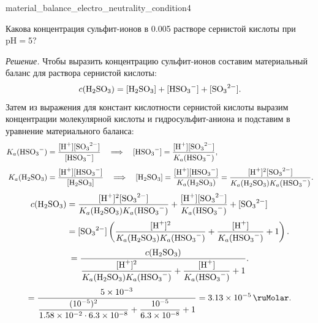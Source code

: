 \begin{example}{}{material_balance_electro_neutrality_condition4}
    \begin{condition}
        Какова концентрация сульфит-ионов в \qty{0,005}{\ruMolar} растворе сернистой кислоты при $\text{pH} = 5$?
    \end{condition}

    \medskip

    \textit{Решение.} Чтобы выразить концентрацию сульфит-ионов составим материальный баланс для раствора сернистой кислоты:
    \begin{equation*}
        c(\ce{H2SO3}) = [\ce{H2SO3}] + [\ce{HSO3^-}] + [\ce{SO3^{2-}}].
    \end{equation*}
    Затем из выражения для констант кислотности сернистой кислоты выразим концентрации молекулярной кислоты и гидросульфит-аниона и подставим в уравнение материального баланса:
    \begin{align*}
        K_a(\ce{HSO3^-}) &= \frac{[\ce{H^+}][\ce{SO3^{2-}}]}{[\ce{HSO3^-}]}
        \quad\Longrightarrow\quad
        [\ce{HSO3^-}] = \frac{[\ce{H^+}][\ce{SO3^{2-}}]}{K_a(\ce{HSO3^-})}, \\[0.8ex]
        K_a(\ce{H2SO3}) &= \frac{[\ce{H^+}][\ce{HSO3^-}]}{[\ce{H2SO3}]}
        \quad\Longrightarrow\quad
        [\ce{H2SO3}] = \frac{[\ce{H^+}][\ce{HSO3^-}]}{K_a(\ce{H2SO3})}
        = \frac{[\ce{H^+}]^2[\ce{SO3^{2-}}]}{K_a(\ce{H2SO3})K_a(\ce{HSO3^-})}.
    \end{align*}
    \begin{align*}
        c(\ce{H2SO3}) &= \frac{[\ce{H^+}]^2[\ce{SO3^{2-}}]}{K_a(\ce{H2SO3})K_a(\ce{HSO3^-})}
        + \frac{[\ce{H^+}][\ce{SO3^{2-}}]}{K_a(\ce{HSO3^-})}
        + [\ce{SO3^{2-}}] \\[0.5ex]
        &= [\ce{SO3^{2-}}]\left(
            \frac{[\ce{H^+}]^2}{K_a(\ce{H2SO3})K_a(\ce{HSO3^-})}
            + \frac{[\ce{H^+}]}{K_a(\ce{HSO3^-})}
            + 1
        \right).
    \end{align*}
    \begin{equation*}
        [\ce{SO3^{2-}}] = \frac{c(\ce{H2SO3})}{
            \dfrac{[\ce{H^+}]^2}{K_a(\ce{H2SO3})K_a(\ce{HSO3^-})}
            + \dfrac{[\ce{H^+}]}{K_a(\ce{HSO3^-})} + 1
        }.
    \end{equation*}
    \begin{equation*}
        [\ce{SO3^{2-}}] = \frac{\num{5e-3}}{
            \dfrac{(\num{e-5})^2}{\num{1,58e-2} \cdot \num{6,3e-8}}
            + \dfrac{\num{e-5}}{\num{6,3e-8}} + 1
        } = \qty{3,13e-5}{\ruMolar}.
    \end{equation*}
\end{example}

